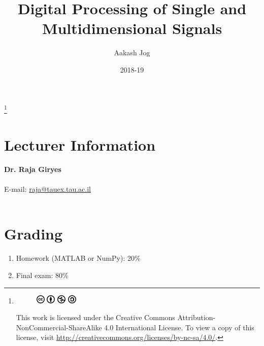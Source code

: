\documentclass[titlepage, fleqn, a4paper, 12pt, twoside]{article}
\title{Digital Processing of Single and Multidimensional Signals}
\author{Aakash Jog}
\date{2018-19}
\theoremstyle{definition}
\theoremstyle{theorem}
\newcommand\blfootnote[1]{%
	\begingroup
	\renewcommand\thefootnote{}\footnote{#1}%
	\addtocounter{footnote}{-1}%
	\endgroup
}
\begin{document}
\begin{titlepage}
\maketitle
\end{titlepage}
\restoregeometry

\blfootnote
{
	\begin{figure}[H]
		\includegraphics[height = 12pt]{cc.pdf}
		\includegraphics[height = 12pt]{by.pdf}
		\includegraphics[height = 12pt]{nc.pdf}
		\includegraphics[height = 12pt]{sa.pdf}
	\end{figure}
	This work is licensed under the Creative Commons Attribution-NonCommercial-ShareAlike 4.0 International License. To view a copy of this license, visit \url{http://creativecommons.org/licenses/by-nc-sa/4.0/}.
} %

\tableofcontents

\clearpage
\section{Lecturer Information}

\textbf{Dr. Raja Giryes}\\
~\\
E-mail: \href{mailto:raja@tauex.tau.ac.il}{raja@tauex.tau.ac.il}\\
~\\

\section{Grading}

\begin{enumerate}
	\item Homework (MATLAB or NumPy): 20\%
	\item Final exam: 80\%
\end{enumerate}

\clearpage
{}
\end{document}
